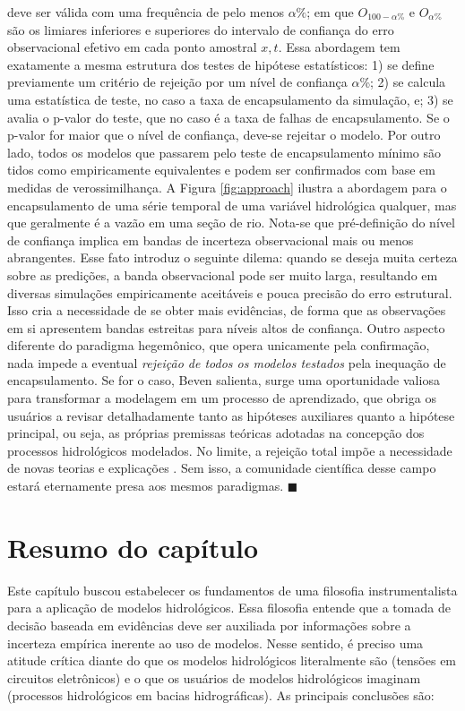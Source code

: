 \documentclass[./main.tex]{subfiles}
\begin{document}
deve ser válida com uma frequência de pelo menos $\alpha\%$; em que $O_{100-\alpha\%}$ e  $O_{\alpha\%}$ são os limiares inferiores e superiores do intervalo de confiança do erro observacional efetivo em cada ponto amostral $x, t$. Essa abordagem tem exatamente a mesma estrutura dos testes de hipótese estatísticos: 1) se define previamente um critério de rejeição por um nível de confiança $\alpha$\%; 2) se calcula uma estatística de teste, no caso a taxa de encapsulamento da simulação, e; 3) se avalia o p-valor do teste, que no caso é a taxa de falhas de encapsulamento. Se o p-valor for maior que o nível de confiança, deve-se rejeitar o modelo. Por outro lado, todos os modelos que passarem pelo teste de encapsulamento mínimo são tidos como empiricamente equivalentes e podem ser confirmados com base em medidas de verossimilhança. A Figura \ref{fig:approach} ilustra a abordagem para o encapsulamento de uma série temporal de uma variável hidrológica qualquer, mas que geralmente é a vazão em uma seção de rio. Nota-se que pré-definição do nível de confiança implica em bandas de incerteza observacional mais ou menos abrangentes. Esse fato introduz o seguinte dilema: quando se deseja muita certeza sobre as predições, a banda observacional pode ser muito larga, resultando em diversas simulações empiricamente aceitáveis e pouca precisão do erro estrutural. Isso cria a necessidade de se obter mais evidências, de forma que as observações em si apresentem bandas estreitas para níveis altos de confiança. Outro aspecto diferente do paradigma hegemônico, que opera unicamente pela confirmação, nada impede a eventual \textit{rejeição de todos os modelos testados} pela inequação de encapsulamento. Se for o caso, Beven salienta, surge uma oportunidade valiosa para transformar a modelagem em um processo de aprendizado, que obriga os usuários a revisar detalhadamente tanto as hipóteses auxiliares quanto a hipótese principal, ou seja, as próprias premissas teóricas adotadas na concepção dos processos hidrológicos modelados. No limite, a rejeição total impõe a necessidade de novas teorias e explicações \cite{Beven2018}. Sem isso, a comunidade científica desse campo estará eternamente presa aos mesmos paradigmas. $\blacksquare$

\clearpage

\section{Resumo do capítulo} \label{sec:epis:summary}

\par Este capítulo buscou estabelecer os fundamentos de uma filosofia instrumentalista para a aplicação de modelos hidrológicos. Essa filosofia entende que a tomada de decisão baseada em evidências deve ser auxiliada por informações sobre a incerteza empírica inerente ao uso de modelos. Nesse sentido, é preciso uma atitude crítica diante do que os modelos hidrológicos literalmente são (tensões em circuitos eletrônicos) e o que os usuários de modelos hidrológicos imaginam (processos hidrológicos em bacias hidrográficas). As principais conclusões são:
\end{document}

